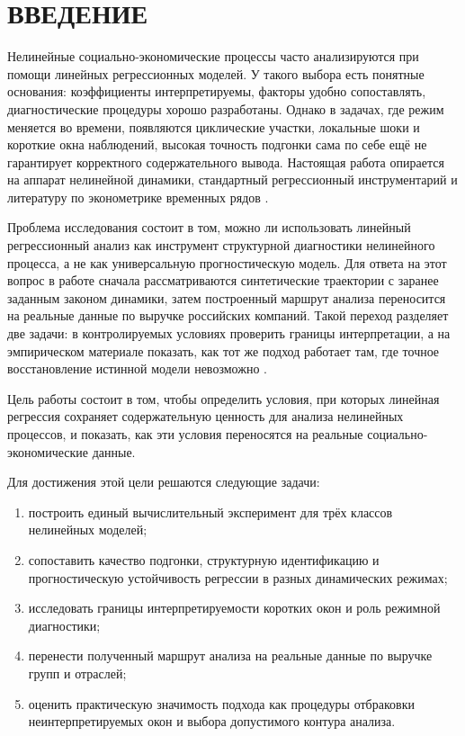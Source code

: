 \chapter*{ВВЕДЕНИЕ}
\label{chap:introduction}

Нелинейные социально-экономические процессы часто анализируются при помощи линейных регрессионных моделей. У такого выбора есть понятные основания: коэффициенты интерпретируемы, факторы удобно сопоставлять, диагностические процедуры хорошо разработаны. Однако в задачах, где режим меняется во времени, появляются циклические участки, локальные шоки и короткие окна наблюдений, высокая точность подгонки сама по себе ещё не гарантирует корректного содержательного вывода. Настоящая работа опирается на аппарат нелинейной динамики, стандартный регрессионный инструментарий и литературу по эконометрике временных рядов \cite{strogatz,montgomery,hamilton,box-jenkins}.

Проблема исследования состоит в том, можно ли использовать линейный регрессионный анализ как инструмент структурной диагностики нелинейного процесса, а не как универсальную прогностическую модель. Для ответа на этот вопрос в работе сначала рассматриваются синтетические траектории с заранее заданным законом динамики, затем построенный маршрут анализа переносится на реальные данные по выручке российских компаний. Такой переход разделяет две задачи: в контролируемых условиях проверить границы интерпретации, а на эмпирическом материале показать, как тот же подход работает там, где точное восстановление истинной модели невозможно \cite{strogatz,hamilton,wooldridge}.

Цель работы состоит в том, чтобы определить условия, при которых линейная регрессия сохраняет содержательную ценность для анализа нелинейных процессов, и показать, как эти условия переносятся на реальные социально-экономические данные.

Для достижения этой цели решаются следующие задачи:
\begin{enumerate}
\item построить единый вычислительный эксперимент для трёх классов нелинейных моделей;
\item сопоставить качество подгонки, структурную идентификацию и прогностическую устойчивость регрессии в разных динамических режимах;
\item исследовать границы интерпретируемости коротких окон и роль режимной диагностики;
\item перенести полученный маршрут анализа на реальные данные по выручке групп и отраслей;
\item оценить практическую значимость подхода как процедуры отбраковки неинтерпретируемых окон и выбора допустимого контура анализа.
\end{enumerate}


